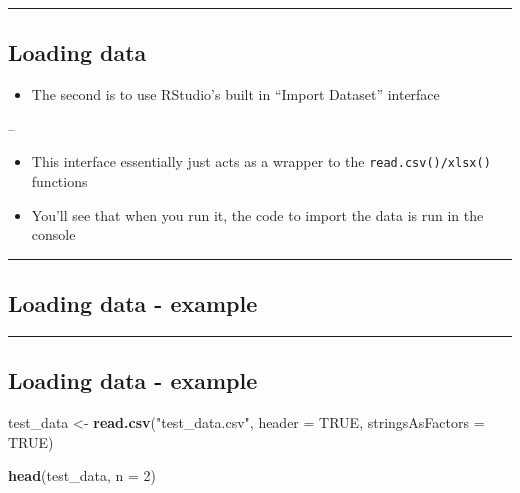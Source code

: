\documentclass[]{article}
\newenvironment{Shaded}{\begin{snugshade}}{\end{snugshade}}
\newcommand{\DataTypeTok}[1]{\textcolor[rgb]{0.13,0.29,0.53}{#1}}
\newcommand{\DecValTok}[1]{\textcolor[rgb]{0.00,0.00,0.81}{#1}}
\newcommand{\KeywordTok}[1]{\textcolor[rgb]{0.13,0.29,0.53}{\textbf{#1}}}
\newcommand{\NormalTok}[1]{#1}
\newcommand{\OtherTok}[1]{\textcolor[rgb]{0.56,0.35,0.01}{#1}}
\newcommand{\StringTok}[1]{\textcolor[rgb]{0.31,0.60,0.02}{#1}}
\providecommand{\tightlist}{%
  \setlength{\itemsep}{0pt}\setlength{\parskip}{0pt}}
\begin{document}
\begin{center}\rule{0.5\linewidth}{\linethickness}\end{center}

\hypertarget{loading-data-1}{%
\subsection{Loading data}\label{loading-data-1}}

\begin{itemize}
\tightlist
\item
  The second is to use RStudio's built in ``Import Dataset'' interface
\end{itemize}

--

\begin{itemize}
\tightlist
\item
  This interface essentially just acts as a wrapper to the
  \texttt{read.csv()/xlsx()} functions
\item
  You'll see that when you run it, the code to import the data is run in
  the console
\end{itemize}

\begin{center}\rule{0.5\linewidth}{\linethickness}\end{center}

\hypertarget{loading-data---example}{%
\subsection{Loading data - example}\label{loading-data---example}}

\begin{center}\rule{0.5\linewidth}{\linethickness}\end{center}

\hypertarget{loading-data---example-1}{%
\subsection{Loading data - example}\label{loading-data---example-1}}

\begin{Shaded}
\begin{Highlighting}[]
\NormalTok{test_data <-}\StringTok{ }\KeywordTok{read.csv}\NormalTok{(}\StringTok{"test_data.csv"}\NormalTok{,}
                      \DataTypeTok{header =} \OtherTok{TRUE}\NormalTok{,}
                      \DataTypeTok{stringsAsFactors =} \OtherTok{TRUE}\NormalTok{)}

\KeywordTok{head}\NormalTok{(test_data, }\DataTypeTok{n =} \DecValTok{2}\NormalTok{)}
\end{Highlighting}
\end{Shaded}
\end{document}
